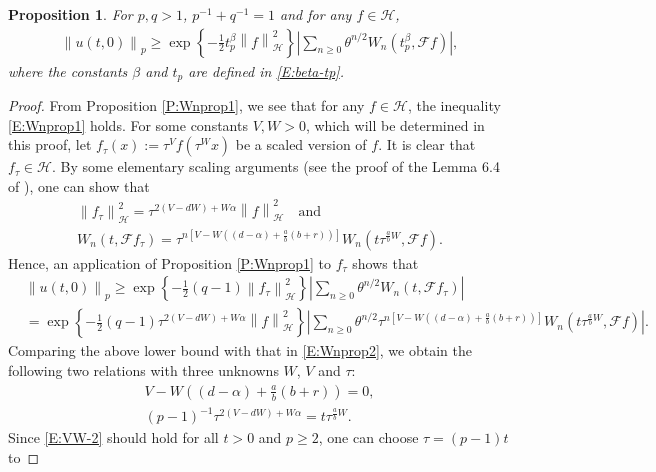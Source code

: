 \documentclass[a4paper,11pt]{article}
\numberwithin{equation}{section}
\numberwithin{equation}{section}
\theoremstyle{plain}
\newtheorem{proposition}[theorem]{Proposition}
\theoremstyle{definition}
\newcommand{\Norm}[1]{\left\|  #1   \right\|}
\begin{document}
\begin{proposition} \label{P:Wnprop2}
  For $p,q > 1$, $p^{-1}+q^{-1}=1$ and for any $f \in \mathcal{H}$,
  \begin{align} \label{E:Wnprop2}
    \Norm{u(t,0)}_p \ge \exp\left\{ -\frac{1}{2} t_p^\beta \Norm{f}_{\mathcal{H}}^2 \right\}\left| \sum_{n \ge 0} \theta^{n/2} W_n\left(t_p^\beta, \mathcal{F}f\right) \right|,
  \end{align}
  where the constants $\beta$ and $t_p$ are defined in \eqref{E:beta-tp}.
\end{proposition}
\begin{proof}
  From Proposition \ref{P:Wnprop1}, we see that for any $f\in \mathcal{H}$, the inequality
  \eqref{E:Wnprop1} holds. For some constants $V,W>0$, which will be determined in this proof, let
  $f_\tau(x):=\tau^V f(\tau^W x)$ be a scaled version of $f$. It is clear that $f_\tau\in
  \mathcal{H}$. By some elementary scaling arguments (see the proof of the Lemma 6.4 of
  \cite{BCC21}), one can show that
  \begin{gather}
    \Norm{f_\tau}_{\mathcal{H}}^2 = \tau^{2(V-dW)+W\alpha} \Norm{f}_\mathcal{H}^2 \quad \text{and}\\
    W_n \left(t,\mathcal{F}f_\tau\right) = \tau^{n\left[ V-W\left( (d-\alpha)+ \frac{a}{b}(b+r)
    \right) \right]}W_n\left(t\tau^{\frac{a}{b}W}, \mathcal{F}f\right).
  \end{gather}
  Hence, an application of Proposition \ref{P:Wnprop1} to $f_\tau$ shows that
  \begin{align*}
    & \Norm{u(t,0)}_p  \ge \exp\left\{ -\frac{1}{2}(q-1)\Norm{f_\tau}_{\mathcal{H}}^2 \right\} \left| \sum_{n \ge 0} \theta^{n/2} W_n(t,\mathcal{F}f_\tau) \right| \\
    & =\exp\left\{ -\frac{1}{2}(q-1)\tau^{2(V-dW)+W\alpha} \Norm{f}_\mathcal{H}^2 \right\} \left| \sum_{n \ge 0} \theta^{n/2} \tau^{n\left[ V-W\left( (d-\alpha)+ \frac{a}{b}(b+r) \right) \right]}W_n\left(t\tau^{\frac{a}{b}W}, \mathcal{F}f\right) \right|.
  \end{align*}
  Comparing the above lower bound with that in \eqref{E:Wnprop2}, we obtain the following two
  relations with three unknowns $W$, $V$ and $\tau$:
  \begin{gather} \label{E:VW-1}
    V-W\left( (d-\alpha)+ \frac{a}{b}(b+r) \right) = 0, \\
    (p-1)^{-1}\tau^{2(V-dW)+W\alpha} = t\tau^{\frac{a}{b}W}. \label{E:VW-2}
  \end{gather}
  Since \eqref{E:VW-2} should hold for all $t>0$ and $p\ge 2$, one can choose $\tau = (p-1)t$ to

\end{proof}
\end{document}
